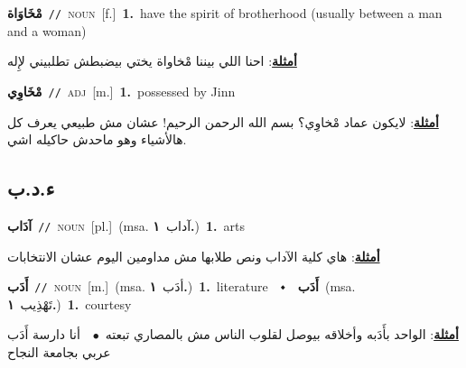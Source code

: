 \documentclass[10pt,a4paper,twoside]{article} %
\begin{document}
\begin{multicols}{2}
{{{{{{{{{{{\setlength\topsep{0pt}\textbf{\foreignlanguage{arabic}{مْخَاوَاة}}\ {\color{gray}\texttt{//}\color{black}}\ \textsc{noun}\ [f.]\ \textbf{1.}~have the spirit of brotherhood (usually between a man and a woman)\  \begin{flushright}\color{gray}\foreignlanguage{arabic}{\textbf{\underline{\foreignlanguage{arabic}{أمثلة}}}: احنا اللي بيننا مْخاواة يختي بيضبطش تطلبيني لإِله}\end{flushright}\color{black}} \vspace{2mm}

{\setlength\topsep{0pt}\textbf{\foreignlanguage{arabic}{مْخَاوِي}}\ {\color{gray}\texttt{//}\color{black}}\ \textsc{adj}\ [m.]\ \textbf{1.}~possessed by Jinn\  \begin{flushright}\color{gray}\foreignlanguage{arabic}{\textbf{\underline{\foreignlanguage{arabic}{أمثلة}}}: لايكون عماد مْخاوِي؟ بسم الله الرحمن الرحيم! عشان مش طبيعي يعرف كل هالأشياء وهو ماحدش حاكيله اشي.}\end{flushright}\color{black}} \vspace{2mm}

\vspace{-3mm}
\subsection*{\color{blue}\foreignlanguage{arabic}{ء.د.ب}\color{blue}{}} 

{\setlength\topsep{0pt}\textbf{\foreignlanguage{arabic}{آدَاب}}\ {\color{gray}\texttt{//}\color{black}}\ \textsc{noun}\ [pl.]\ \color{gray}(msa. \foreignlanguage{arabic}{آداب}~\foreignlanguage{arabic}{\textbf{١.}})\color{black}\ \textbf{1.}~arts\  \begin{flushright}\color{gray}\foreignlanguage{arabic}{\textbf{\underline{\foreignlanguage{arabic}{أمثلة}}}: هاي كلية الآداب ونص طلابها مش مداومين اليوم عشان الانتخابات}\end{flushright}\color{black}} \vspace{2mm}

{\setlength\topsep{0pt}\textbf{\foreignlanguage{arabic}{أَدَب}}\ {\color{gray}\texttt{//}\color{black}}\ \textsc{noun}\ [m.]\ \color{gray}(msa. \foreignlanguage{arabic}{أدَب}~\foreignlanguage{arabic}{\textbf{١.}})\color{black}\ \textbf{1.}~literature\ \ $\smblkdiamond$\ \ \setlength\topsep{0pt}\textbf{\foreignlanguage{arabic}{أَدَب}}\ \color{gray}(msa. \foreignlanguage{arabic}{تَهْذِيب}~\foreignlanguage{arabic}{\textbf{١.}})\color{black}\ \textbf{1.}~courtesy\  \begin{flushright}\color{gray}\foreignlanguage{arabic}{\textbf{\underline{\foreignlanguage{arabic}{أمثلة}}}: الواحد بأَدَبه وأخلاقه بيوصل لقلوب الناس مش بالمصاري تبعته\ $\bullet$\ \  أنا دارسة أَدَب عربي بجامعة النجاح}\end{flushright}\color{black}} \vspace{2mm}

}}}}}}}}}}
\end{multicols}
\end{document}
